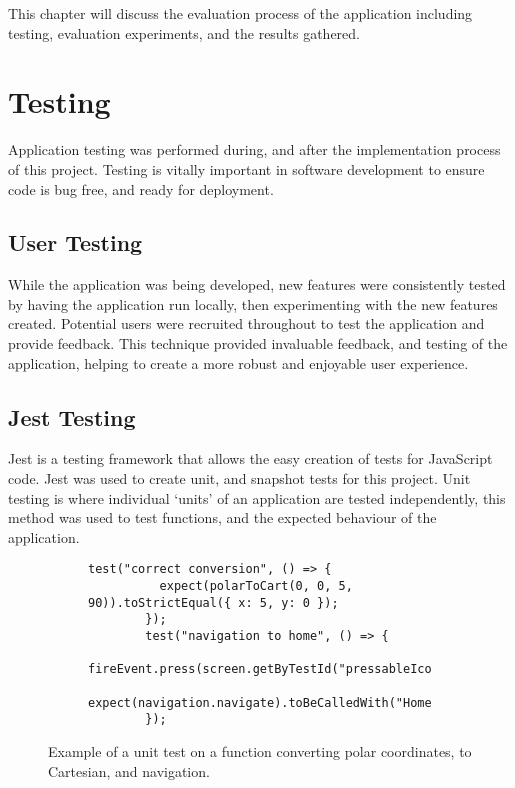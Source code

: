 This chapter will discuss the evaluation process of the application including testing, evaluation experiments, and the results gathered.

\section{Testing}
Application testing was performed during, and after the implementation process of this project. Testing is vitally important in software development to ensure code is bug free, and ready for deployment.

\subsection{User Testing}
While the application was being developed, new features were consistently tested by having the application run locally, then experimenting with the new features created. Potential users were recruited throughout to test the application and provide feedback. This technique provided invaluable feedback, and testing of the application, helping to create a more robust and enjoyable user experience.

\subsection{Jest Testing}
Jest is a testing framework that allows the easy creation of tests for JavaScript code. Jest was used to create unit, and snapshot tests for this project. Unit testing is where individual `units' of an application are tested independently, this method was used to test functions, and the expected behaviour of the application. 

\begin{figure}[!htbp]
    \centering
    \begin{subfigure}[b]{0.8\textwidth}
        \begin{lstlisting}[language=jsJsx]
        test("correct conversion", () => {
          expect(polarToCart(0, 0, 5, 90)).toStrictEqual({ x: 5, y: 0 });
        });
        test("navigation to home", () => {
            fireEvent.press(screen.getByTestId("pressableIcon"));
            expect(navigation.navigate).toBeCalledWith("HomeScreen");
        });
        \end{lstlisting}
    \end{subfigure}
\caption[Example of a unit test]{Example of a unit test on a function converting polar coordinates, to Cartesian, and navigation.}
\label{fig:jestUnit}
\end{figure}
\FloatBarrier

